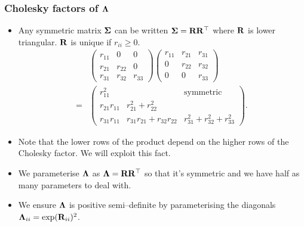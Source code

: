 \documentclass{beamer}
\begin{document}
	\begin{frame}
		\frametitle{Cholesky factors of ${\boldsymbol \Lambda}$}
		\begin{itemize}
			\item Any symmetric matrix ${\boldsymbol \Sigma}$ can be written ${\boldsymbol \Sigma} = {\bf R} {\bf R}^\top$
			      where ${\bf R}$ is lower triangular. ${\bf R}$ is unique if $r_{ii} \geq 0$. 
			      \begin{align*}
			      	&\begin{pmatrix}
			      	r_{11}          & 0                                    & 0                                     \\
			      	r_{21}          & r_{22}                             & 0                                     \\
			      	r_{31}          & r_{32}                             & r_{33}                              
			      	\end{pmatrix}
			      	\begin{pmatrix}
			      	r_{11}          & r_{21}                             & r_{31}                              \\
			      	0                 & r_{22}                             & r_{32}                              \\
			      	0                 & 0                                    & r_{33}                              
			      	\end{pmatrix}
			      	\\
			      	=& \begin{pmatrix}
			      	r_{11}^2        &                                      & \text{symmetric}                      \\
			      	r_{21}r_{11} & r_{21}^2 + r_{22}^2 \\
			      	r_{31} r_{11} & r_{31}r_{21} + r_{32} r_{22} & r_{31}^2 + r_{32} ^2 + r_{33}^2 
			      	\end{pmatrix}.
			      \end{align*}
			\item Note that the lower rows of the product depend on the higher rows of the Cholesky factor. We will
			      exploit this fact.
			\item We parameterise ${\boldsymbol \Lambda}$ as ${\boldsymbol \Lambda} = {\bf R} {\bf R}^\top$ so that it's symmetric
						and	we have half as many parameters to deal with.
			\item We ensure ${\boldsymbol \Lambda}$ is positive semi--definite by parameterising the diagonals
						${\boldsymbol \Lambda}_{ii} = \exp({\bf R}_{ii})^2$.
		\end{itemize}	
	\end{frame}
		
\end{document}

